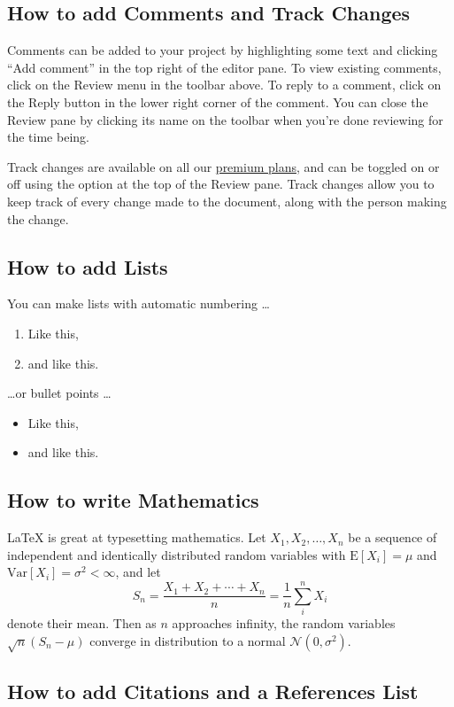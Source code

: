 \documentclass{article}
\begin{document}
\subsection{How to add Comments and Track Changes}

Comments can be added to your project by highlighting some text and clicking ``Add comment'' in the top right of the editor pane. To view existing comments, click on the Review menu in the toolbar above. To reply to a comment, click on the Reply button in the lower right corner of the comment. You can close the Review pane by clicking its name on the toolbar when you're done reviewing for the time being.

Track changes are available on all our \href{https://www.overleaf.com/user/subscription/plans}{premium plans}, and can be toggled on or off using the option at the top of the Review pane. Track changes allow you to keep track of every change made to the document, along with the person making the change. 

\subsection{How to add Lists}

You can make lists with automatic numbering \dots

\begin{enumerate}
\item Like this,
\item and like this.
\end{enumerate}
\dots or bullet points \dots
\begin{itemize}
\item Like this,
\item and like this.
\end{itemize}

\subsection{How to write Mathematics}

\LaTeX{} is great at typesetting mathematics. Let $X_1, X_2, \ldots, X_n$ be a sequence of independent and identically distributed random variables with $\text{E}[X_i] = \mu$ and $\text{Var}[X_i] = \sigma^2 < \infty$, and let
\[S_n = \frac{X_1 + X_2 + \cdots + X_n}{n}
      = \frac{1}{n}\sum_{i}^{n} X_i\]
denote their mean. Then as $n$ approaches infinity, the random variables $\sqrt{n}(S_n - \mu)$ converge in distribution to a normal $\mathcal{N}(0, \sigma^2)$.


\subsection{How to add Citations and a References List}



\end{document}
